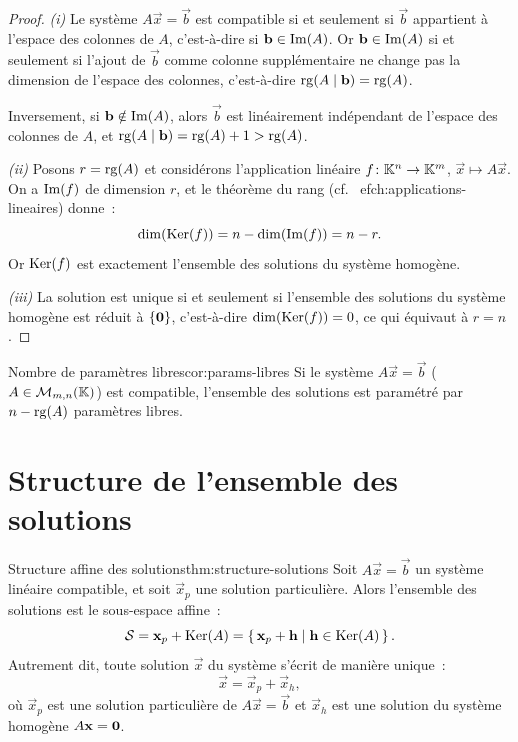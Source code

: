 \begin{proof}
  \emph{(i)} Le système $A\vec{x}=\vec{b}$ est compatible si et seulement
  si $\vec{b}$ appartient à l'espace des colonnes de $A$, c'est-à-dire si
  $\mathbf{b}\in\operatorname{Im}(A)$. Or $\mathbf{b}\in\operatorname{Im}(A)$ si et seulement si l'ajout de
  $\vec{b}$ comme colonne supplémentaire ne change pas la dimension de
  l'espace des colonnes, c'est-à-dire
  $\operatorname{rg}(A\mid\mathbf{b})=\operatorname{rg}(A)$.

  Inversement, si $\mathbf{b}\notin\operatorname{Im}(A)$, alors $\vec{b}$ est linéairement
  indépendant de l'espace des colonnes de $A$, et
  $\operatorname{rg}(A\mid\mathbf{b})=\operatorname{rg}(A)+1>\operatorname{rg}(A)$.

  \emph{(ii)} Posons $r=\operatorname{rg}(A)$ et considérons l'application linéaire
  $f\colon{\mathbb{K}}^n\to{\mathbb{K}}^m$, $\vec{x}\mapsto A\vec{x}$. On a $\operatorname{Im}(f)$
  de dimension $r$, et le théorème du rang
  (cf.~
ef{ch:applications-lineaires}) donne~:
  \[
    \dim(\operatorname{Ker}(f))=n-\dim(\operatorname{Im}(f))=n-r.
  \]
  Or $\operatorname{Ker}(f)$ est exactement l'ensemble des solutions du système homogène.

  \emph{(iii)} La solution est unique si et seulement si l'ensemble des
  solutions du système homogène est réduit à $\left\{\mathbf{0}\right\}$, c'est-à-dire
  $\dim(\operatorname{Ker}(f))=0$, ce qui équivaut à $r=n$.
\end{proof}

\begin{corollary}{Nombre de paramètres libres}{cor:params-libres}
  Si le système $A\vec{x}=\vec{b}$ ($A\in\mathcal{M}_{m,n}({\mathbb{K}})$) est compatible,
  l'ensemble des solutions est paramétré par $n-\operatorname{rg}(A)$ paramètres libres.
\end{corollary}

\section{Structure de l'ensemble des solutions}\label{sec:structure-solutions}

\begin{theorem}{Structure affine des solutions}{thm:structure-solutions}
  Soit $A\vec{x}=\vec{b}$ un système linéaire compatible, et soit
  $\vec{x}_p$ une solution particulière. Alors l'ensemble des solutions
  est le sous-espace affine~:
  \begin{equation}\label{eq:structure-sol}
    {\mathcal{S}} = \mathbf{x}_p + \operatorname{Ker}(A) = \left\{\,\mathbf{x}_p+\mathbf{h}\;\middle|\;\mathbf{h}\in\operatorname{Ker}(A)\,\right\}.
  \end{equation}
  Autrement dit, toute solution $\vec{x}$ du système s'écrit de manière
  unique~:
  \[
    \vec{x} = \vec{x}_p + \vec{x}_h,
  \]
  où $\vec{x}_p$ est une solution particulière de $A\vec{x}=\vec{b}$ et
  $\vec{x}_h$ est une solution du système homogène $A\mathbf{x}=\mathbf{0}$.
\end{theorem}

